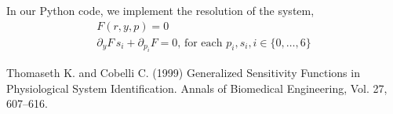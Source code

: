 \documentclass[11pt,a4paper]{article}
\begin{document}
\vspace{1cm}
In our Python code, we implement the resolution of the system, 
$$\begin{array}{l}
F(r, y, p) = 0 \\
\partial_y F \, s_i + \partial_{p_i} F = 0 , \, \text{for each }p_i, s_i, i \in \lbrace 0, \dots, 6\rbrace
\end{array}$$

\vspace{1cm}


\begin{thebibliography}{10}

 Thomaseth K. and Cobelli C. (1999) Generalized Sensitivity Functions in Physiological System Identification. Annals of Biomedical Engineering, Vol. 27, 607--616.

\end{thebibliography}
\end{document}
